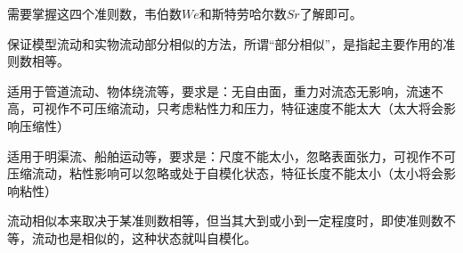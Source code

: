 需要掌握这四个准则数，韦伯数$We$和斯特劳哈尔数$Sr$了解即可。



\begin{definition}[近似模型法]
	保证模型流动和实物流动部分相似的方法，所谓“部分相似”，是指起主要作用的准则数相等。
\end{definition}


适用于管道流动、物体绕流等，要求是：无自由面，重力对流态无影响，流速不高，可视作不可压缩流动，只考虑粘性力和压力，特征速度不能太大（太大将会影响压缩性）


适用于明渠流、船舶运动等，要求是：尺度不能太小，忽略表面张力，可视作不可压缩流动，粘性影响可以忽略或处于自模化状态，特征长度不能太小（太小将会影响粘性）


\begin{definition}[自模化]
	流动相似本来取决于某准则数相等，但当其大到或小到一定程度时，即使准则数不等，流动也是相似的，这种状态就叫自模化。
\end{definition}